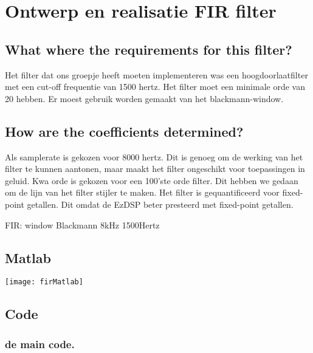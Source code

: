 \section{Ontwerp en realisatie FIR filter}

\subsection{What where the requirements for this filter?}
Het filter dat ons groepje heeft moeten implementeren was een hoogdoorlaatfilter met een cut-off frequentie van 1500 hertz. 
Het filter moet een minimale orde van 20 hebben. Er moest gebruik worden gemaakt van het blackmann-window.

\subsection{How are the coefficients determined?}
Als samplerate is gekozen voor 8000 hertz. Dit is genoeg om de werking van het filter te kunnen aantonen, maar maakt het filter ongeschikt voor toepassingen in geluid. 
Kwa orde is gekozen voor een 100'ste orde filter. Dit hebben we gedaan om de lijn van het filter stijler te maken.
Het filter is gequantificeerd voor fixed-point getallen. Dit omdat de EzDSP beter presteerd met fixed-point getallen.


    \begin{enumerate}[label=\emph{\alph*)}]
         FIR: window
         Blackmann
         8kHz
         1500Hertz
    \end{enumerate}
    
    \subsection{Matlab}
    
    \texttt{[image: firMatlab]}\par\vspace{1cm}
    \clearpage
    \subsection{Code}

    \subsubsection{de main code.}
        
